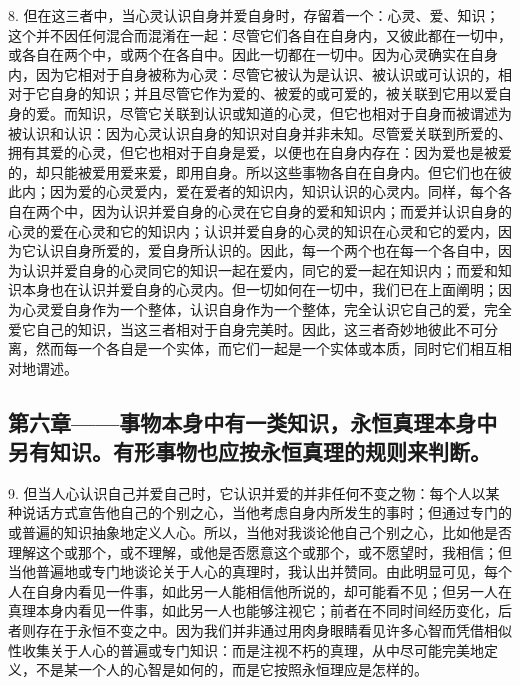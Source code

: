 8. 但在这三者中，当心灵认识自身并爱自身时，存留着一个：心灵、爱、知识；这个并不因任何混合而混淆在一起：尽管它们各自在自身内，又彼此都在一切中，或各自在两个中，或两个在各自中。因此一切都在一切中。因为心灵确实在自身内，因为它相对于自身被称为心灵：尽管它被认为是认识、被认识或可认识的，相对于它自身的知识；并且尽管它作为爱的、被爱的或可爱的，被关联到它用以爱自身的爱。而知识，尽管它关联到认识或知道的心灵，但它也相对于自身而被谓述为被认识和认识：因为心灵认识自身的知识对自身并非未知。尽管爱关联到所爱的、拥有其爱的心灵，但它也相对于自身是爱，以便也在自身内存在：因为爱也是被爱的，却只能被爱用爱来爱，即用自身。所以这些事物各自在自身内。但它们也在彼此内；因为爱的心灵爱内，爱在爱者的知识内，知识认识的心灵内。同样，每个各自在两个中，因为认识并爱自身的心灵在它自身的爱和知识内；而爱并认识自身的心灵的爱在心灵和它的知识内；认识并爱自身的心灵的知识在心灵和它的爱内，因为它认识自身所爱的，爱自身所认识的。因此，每一个两个也在每一个各自中，因为认识并爱自身的心灵同它的知识一起在爱内，同它的爱一起在知识内；而爱和知识本身也在认识并爱自身的心灵内。但一切如何在一切中，我们已在上面阐明；因为心灵爱自身作为一个整体，认识自身作为一个整体，完全认识它自己的爱，完全爱它自己的知识，当这三者相对于自身完美时。因此，这三者奇妙地彼此不可分离，然而每一个各自是一个实体，而它们一起是一个实体或本质，同时它们相互相对地谓述。\par


\subsection{第六章——事物本身中有一类知识，永恒真理本身中另有知识。有形事物也应按永恒真理的规则来判断。}

9. 但当人心认识自己并爱自己时，它认识并爱的并非任何不变之物：每个人以某种说话方式宣告他自己的个别之心，当他考虑自身内所发生的事时；但通过专门的或普遍的知识抽象地定义人心。所以，当他对我谈论他自己个别之心，比如他是否理解这个或那个，或不理解，或他是否愿意这个或那个，或不愿望时，我相信；但当他普遍地或专门地谈论关于人心的真理时，我认出并赞同。由此明显可见，每个人在自身内看见一件事，如此另一人能相信他所说的，却可能看不见；但另一人在真理本身内看见一件事，如此另一人也能够注视它；前者在不同时间经历变化，后者则存在于永恒不变之中。因为我们并非通过用肉身眼睛看见许多心智而凭借相似性收集关于人心的普遍或专门知识：而是注视不朽的真理，从中尽可能完美地定义，不是某一个人的心智是如何的，而是它按照永恒理应是怎样的。\par

